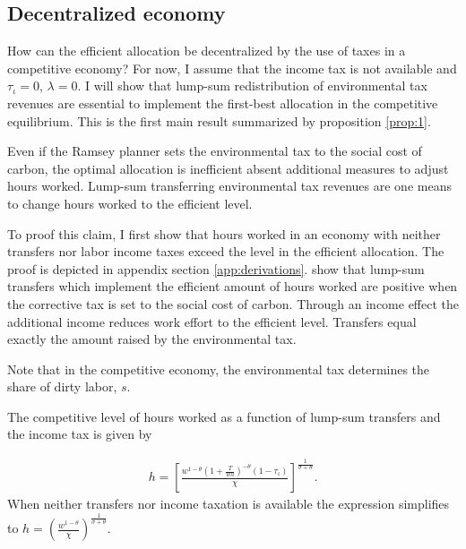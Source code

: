\subsection{Decentralized economy}

How can the efficient allocation be decentralized by the use of taxes in a competitive economy? For now, I assume that the income tax is not available and $\tau_{\iota}=0$, $\lambda=0$.
I will show that lump-sum redistribution of environmental tax revenues are essential to implement the first-best allocation in the competitive equilibrium. This is the first main result summarized by proposition \ref{prop:1}. 

\begin{prop}\label{prop:1}
Even if the Ramsey planner sets the environmental tax to the social cost of carbon, %
the optimal allocation is inefficient absent additional measures to adjust hours worked. Lump-sum transferring environmental tax revenues are one means to change hours worked to the efficient level. 
\end{prop}


To proof this claim, I first show that hours worked in an economy with neither transfers nor labor income taxes exceed the level in the efficient allocation. The proof is depicted in appendix section \ref{app:derivations}. 
show that lump-sum transfers which implement the efficient amount of hours worked are positive when the corrective tax is set to the social cost of carbon. Through an income effect the additional income reduces work effort to the efficient level. Transfers equal exactly the amount raised by the environmental tax. 

Note that in the competitive economy, the environmental tax determines the share of dirty labor, $s$. 

The competitive level of hours worked as a function of lump-sum transfers and the income tax is given by

\begin{align}
h = \left[\frac{w^{1-\theta}\left(1+\frac{T}{wh}\right)^{-\theta}(1-\tau_{\iota})}{\chi}\right]^{\frac{1}{\sigma+\theta}}.\label{eq:hopt}
\end{align}
When neither transfers nor income taxation is available the expression simplifies to $h=\left(\frac{w^{1-\theta}}{\chi}\right)^\frac{1}{\sigma +\theta}$.


